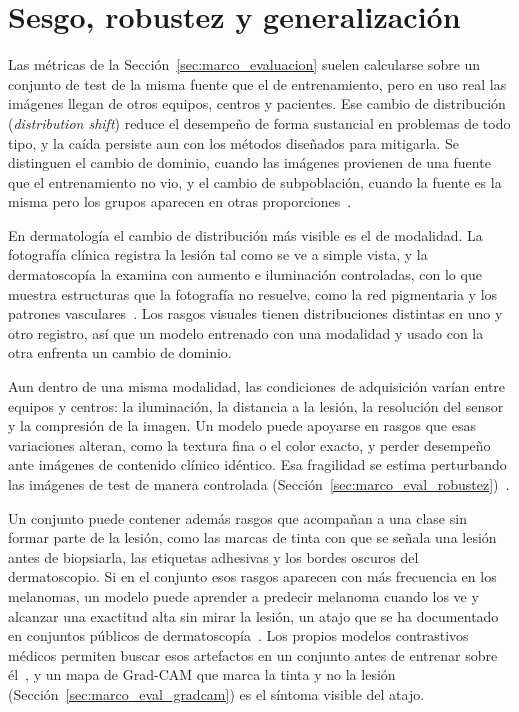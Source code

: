 \section{Sesgo, robustez y generalización}
\label{sec:marco_generalizacion}

Las métricas de la Sección~\ref{sec:marco_evaluacion} suelen calcularse sobre un conjunto de test de la misma
fuente que el de entrenamiento, pero en uso real las imágenes llegan de otros equipos, centros y pacientes.
Ese cambio de distribución (\emph{distribution shift}) reduce el desempeño de forma sustancial en problemas de
todo tipo, y la caída persiste aun con los métodos diseñados para mitigarla. Se distinguen el cambio de
dominio, cuando las imágenes provienen de una fuente que el entrenamiento no vio, y el cambio de
subpoblación, cuando la fuente es la misma pero los grupos aparecen en otras
proporciones~\cite{koh2021wilds}.

En dermatología el cambio de distribución más visible es el de modalidad. La fotografía clínica registra la
lesión tal como se ve a simple vista, y la dermatoscopía la examina con aumento e iluminación controladas, con
lo que muestra estructuras que la fotografía no resuelve, como la red pigmentaria y los patrones
vasculares~\cite{dinnes2018dermoscopy,kittler2016standardization}. Los rasgos visuales tienen distribuciones
distintas en uno y otro registro, así que un modelo entrenado con una modalidad y usado con la otra enfrenta
un cambio de dominio.

Aun dentro de una misma modalidad, las condiciones de adquisición varían entre equipos y centros: la
iluminación, la distancia a la lesión, la resolución del sensor y la compresión de la imagen. Un modelo puede
apoyarse en rasgos que esas variaciones alteran, como la textura fina o el color exacto, y perder desempeño
ante imágenes de contenido clínico idéntico. Esa fragilidad se estima perturbando las imágenes de test de
manera controlada (Sección~\ref{sec:marco_eval_robustez})~\cite{hendrycks2019benchmarking}.

Un conjunto puede contener además rasgos que acompañan a una clase sin formar parte de la lesión, como las
marcas de tinta con que se señala una lesión antes de biopsiarla, las etiquetas adhesivas y los bordes oscuros
del dermatoscopio. Si en el conjunto esos rasgos aparecen con más frecuencia en los melanomas, un modelo puede
aprender a predecir melanoma cuando los ve y alcanzar una exactitud alta sin mirar la lesión, un atajo que se
ha documentado en conjuntos públicos de dermatoscopía~\cite{yan2023towards}. Los propios modelos contrastivos
médicos permiten buscar esos artefactos en un conjunto antes de entrenar sobre él~\cite{kim2024transparent}, y
un mapa de Grad-CAM que marca la tinta y no la lesión (Sección~\ref{sec:marco_eval_gradcam}) es el síntoma
visible del atajo.

